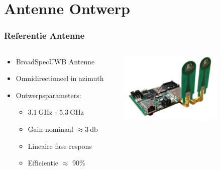 \documentclass{beamer}
\begin{document}
\section{Antenne Ontwerp}
  \begin{frame}
  \frametitle{Referentie Antenne}
  \begin{columns}[c]
  \begin{column}{0.5\textwidth}
    \begin{itemize}
      \item BroadSpec\texttrademark  UWB Antenne 
      \item Omnidirectioneel in azimuth
      \item Ontwerpsparameters:
      \begin{itemize}
        \item $\SI{3.1}{\giga\hertz}$ - $\SI{5.3}{\giga\hertz}$
        \item Gain nominaal $\approx \SI{3}{\decibel}$ 
        \item Lineaire fase respons
        \item Efficientie $\approx$ 90\%
      \end{itemize}
    \end{itemize}
    \end{column}

    \begin{column}{0.5\textwidth}
    \centering
      \includegraphics[width=0.7\textwidth]{images/Pulson400UWB.jpg}
    \end{column}
    \end{columns}

  \end{frame}
\end{document}
